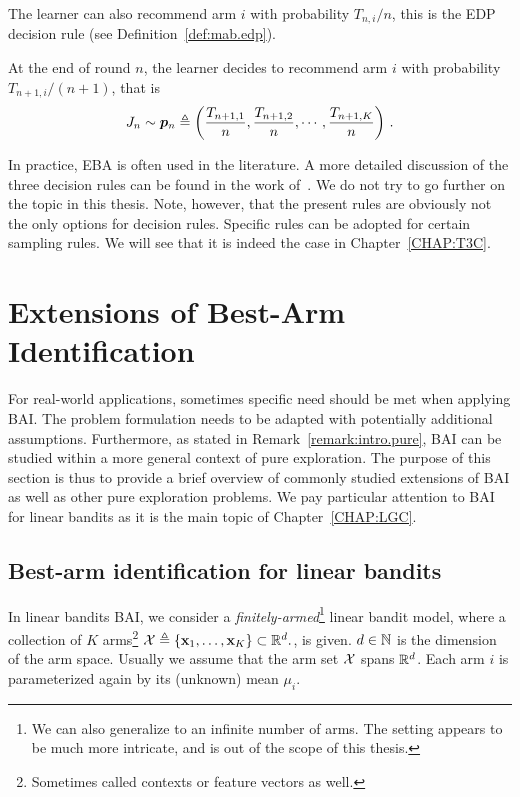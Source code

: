The learner can also recommend arm $i$ with probability $T_{n,i}/n$, this is the EDP decision rule (see Definition~\ref{def:mab.edp}).

\begin{definition}
\begin{leftbar}[defnbar]\label{def:mab.edp}
    At the end of round $n$, the learner decides to recommend arm $i$ with probability $T_{n+1,i}/(n+1)$, that is
    \[
        J_n \sim \boldsymbol{p}_{n}\triangleq\left(\frac{T_{n+1,1}}{n},\frac{T_{n+1,2}}{n},\cdots,\frac{T_{n+1,K}}{n}\right)\,.
    \]
\end{leftbar}
\end{definition}

In practice, EBA is often used in the literature. A more detailed discussion of the three decision rules can be found in the work of~\cite{bubeck2009pure}. We do not try to go further on the topic in this thesis. Note, however, that the present rules are obviously not the only options for decision rules. Specific rules can be adopted for certain sampling rules. We will see that it is indeed the case in Chapter~\ref{CHAP:T3C}.

\section{Extensions of Best-Arm Identification}\label{sec:mab.extensions}

For real-world applications, sometimes specific need should be met when applying BAI. The problem formulation needs to be adapted with potentially additional assumptions. Furthermore, as stated in Remark~\ref{remark:intro.pure}, BAI can be studied within a more general context of pure exploration. The purpose of this section is thus to provide a brief overview of commonly studied extensions of BAI as well as other pure exploration problems. We pay particular attention to BAI for linear bandits as it is the main topic of Chapter~\ref{CHAP:LGC}.

\subsection{Best-arm identification for linear bandits}\label{sec:mab.extensions.linear}

In linear bandits BAI, we consider a \emph{finitely-armed}\footnote{We can also generalize to an infinite number of arms. The setting appears to be much more intricate, and is out of the scope of this thesis.} linear bandit model, where a collection of $K$ arms\footnote{Sometimes called contexts or feature vectors as well.} $\mathcal{X}\triangleq\{{\bf x}_1,\ldots,{\bf x}_K\}\subset \mathbb{R}^d.$, is given. $d\in{\mathbb N}$ is the dimension of the arm space. Usually we assume that the arm set $\mathcal{X}$ spans $\mathbb{R}^d$. Each arm $i$ is parameterized again by its (unknown) mean $\mu_i$. 

